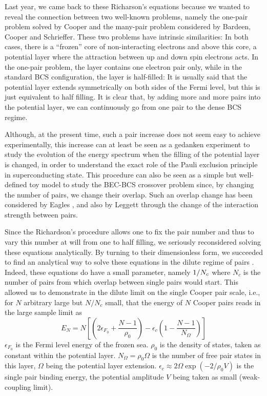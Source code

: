 \documentclass[aps,prb,superscriptaddress,twocolumn]{revtex4}
\begin{document}
Last year, we came back to  these Richarson's equations because we wanted to reveal the connection 
between two well-known problems, namely the
one-pair problem solved by Cooper and the many-pair problem considered by Bardeen, Cooper and Schrieffer. 
These two problems have intrinsic similarities: In
both cases, there is a ``frozen'' core of non-interacting electrons and above this core, 
a potential layer where the attraction between up and
down spin electrons acts. In the one-pair problem, the layer contains one electron pair 
only, while in the standard BCS configuration, the
layer is half-filled: It is usually said that the potential layer extends symmetrically 
on both sides of the Fermi level, but this is just equivalent to half filling.
It is clear that, by adding more and more pairs into the potential layer, we can 
continuously go from one pair to the dense BCS regime. 

Although, at the present time, such a pair increase
does not seem easy to achieve experimentally, this increase can at least be seen as a 
gedanken experiment to study the evolution of the energy spectrum when
the filling of the potential layer is changed, in order to understand the exact role of the Pauli
exclusion principle in superconducting state. 
This procedure can also be
seen as a simple but well-defined toy model to study the BEC-BCS crossover
problem since, by changing the number of pairs, we change their overlap. 
Such an overlap change has been considered by Eagles \cite{Eagle}, 
and also by Leggett \cite{LeggettCrossover} through the change of the interaction strength between pairs.

Since the Richardson's procedure allows one to fix the pair number and thus to vary 
this number at will from one to half filling, we seriously reconsidered 
solving these equations analytically. By turning to their dimensionless form, we succeeded to
find an analytical way to solve these equations in the dilute regime of
pairs \cite{paper1}. Indeed, these equations do have a small parameter, namely $1/{%
N_{c}}$ where $N_{c}$ is the number of pairs from which overlap between single pairs would start. 
This allowed us to demonstrate in the dilute limit on
the single Cooper pair scale, i.e., for $N$ arbitrary large but $N/N_{c}$ small, that the energy of $%
N$ Cooper pairs reads in the large sample limit as 
\begin{equation}
E_{N}=N\left[ \left( 2\epsilon _{F_{0}}+\frac{N-1}{\rho _{0}}%
\right)-\epsilon _{c}\left( 1-\frac{N-1}{N_{\Omega }}\right) \right]
\label{eq:eN}
\end{equation}%
$\epsilon _{F_{0}}$ is the Fermi level energy of the frozen sea. 
 $\rho
_{0} $ is the density of states, taken as constant within the potential
layer. $N_{\Omega }=\rho _{0}\Omega $ is the number of free pair states in this
layer, $\Omega $ being the potential layer extension. $\epsilon _{c}\approx
2\Omega \exp \left( -2/\rho _{0}V\right) $ is the single pair binding
energy, the potential amplitude $V$ being taken as small (weak-coupling limit).
\end{document}
